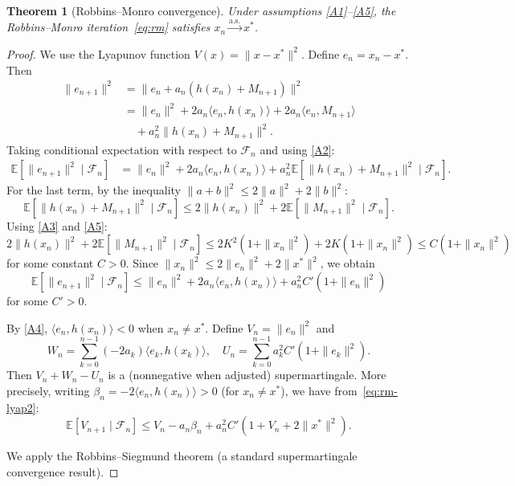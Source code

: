 \documentclass[11pt,a4paper]{article}
\theoremstyle{definition}
\theoremstyle{plain}
\newtheorem{theorem}{Theorem}[section]
\theoremstyle{remark}
\newcommand{\E}{\mathbb{E}}
\newcommand{\cas}{\xrightarrow{\text{a.s.}}}
\begin{document}
\begin{theorem}[Robbins--Monro convergence]
\label{thm:rm-convergence}
Under assumptions \ref{A1}--\ref{A5}, the Robbins--Monro iteration~\eqref{eq:rm}
satisfies $x_n \cas x^*$.
\end{theorem}

\begin{proof}
We use the Lyapunov function $V(x) = \|x - x^*\|^2$. Define $e_n = x_n - x^*$.
Then
\begin{align*}
  \|e_{n+1}\|^2
    &= \|e_n + a_n(h(x_n) + M_{n+1})\|^2 \\
    &= \|e_n\|^2 + 2a_n \langle e_n, h(x_n)\rangle
      + 2a_n \langle e_n, M_{n+1}\rangle \\
    &\quad + a_n^2 \|h(x_n) + M_{n+1}\|^2.
\end{align*}
Taking conditional expectation with respect to $\mathcal{F}_n$ and using \ref{A2}:
\begin{align}
  \E[\|e_{n+1}\|^2 \mid \mathcal{F}_n]
    &= \|e_n\|^2 + 2a_n \langle e_n, h(x_n)\rangle
      + a_n^2 \E[\|h(x_n) + M_{n+1}\|^2 \mid \mathcal{F}_n]. \label{eq:rm-lyap}
\end{align}
For the last term, by the inequality $\|a+b\|^2 \leq 2\|a\|^2 + 2\|b\|^2$:
\[
  \E[\|h(x_n) + M_{n+1}\|^2 \mid \mathcal{F}_n]
    \leq 2\|h(x_n)\|^2 + 2\E[\|M_{n+1}\|^2 \mid \mathcal{F}_n].
\]
Using \ref{A3} and \ref{A5}:
\[
  2\|h(x_n)\|^2 + 2\E[\|M_{n+1}\|^2 \mid \mathcal{F}_n]
    \leq 2K^2(1 + \|x_n\|^2) + 2K(1 + \|x_n\|^2)
    \leq C(1 + \|x_n\|^2)
\]
for some constant $C > 0$. Since $\|x_n\|^2 \leq 2\|e_n\|^2 + 2\|x^*\|^2$, we
obtain
\begin{equation}
\label{eq:rm-lyap2}
  \E[\|e_{n+1}\|^2 \mid \mathcal{F}_n]
    \leq \|e_n\|^2 + 2a_n \langle e_n, h(x_n)\rangle + a_n^2 C'(1 + \|e_n\|^2)
\end{equation}
for some $C' > 0$.

By \ref{A4}, $\langle e_n, h(x_n) \rangle < 0$ when $x_n \neq x^*$. Define
$V_n = \|e_n\|^2$ and
\[
  W_n = \sum_{k=0}^{n-1} (-2a_k) \langle e_k, h(x_k)\rangle, \quad
  U_n = \sum_{k=0}^{n-1} a_k^2 C'(1 + \|e_k\|^2).
\]
Then $V_n + W_n - U_n$ is a (nonnegative when adjusted) supermartingale. More
precisely, writing $\beta_n = -2\langle e_n, h(x_n)\rangle > 0$ (for $x_n \neq x^*$),
we have from~\eqref{eq:rm-lyap2}:
\[
  \E[V_{n+1} \mid \mathcal{F}_n] \leq V_n - a_n \beta_n + a_n^2 C'(1 + V_n + 2\|x^*\|^2).
\]

We apply the Robbins--Siegmund theorem (a standard supermartingale convergence result).


\end{proof}
\end{document}
